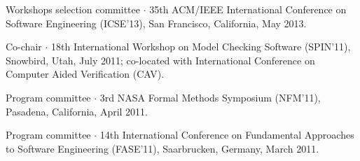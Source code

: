 \documentclass[ComputerScience]{vita}
\begin{document}
\begin{vita}
\begin{Panel and Committee Service}
\item Workshops selection committee $\cdot$ 35th ACM/IEEE International Conference on Software Engineering (ICSE'13), San Francisco, California, May 2013.
\item Co-chair $\cdot$ 18th International Workshop on Model Checking Software (SPIN'11), Snowbird, Utah, July 2011; co-located with International Conference on Computer Aided Verification (CAV).
\item Program committee $\cdot$ 3rd NASA Formal Methods Symposium (NFM'11), Pasadena, California, April 2011. 
\item Program committee $\cdot$ 14th International Conference on Fundamental Approaches to Software Engineering (FASE'11), Saarbrucken, Germany, March 2011.

\end{Panel and Committee Service}
\end{vita}
\end{document}
